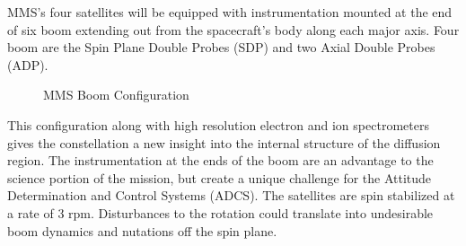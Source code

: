 MMS's four satellites will be equipped with instrumentation mounted at the end of six boom extending out from the spacecraft's body along each major axis.  Four boom are the Spin Plane Double Probes (SDP) and two Axial Double Probes (ADP).

\begin{figure}[H]
\centerline{}
\caption{MMS Boom Configuration \cite{tsat1c}}
\label{fig:booms}
\end{figure}

This configuration along with high resolution electron and ion spectrometers gives the constellation a new insight into the internal structure of the diffusion region.  The instrumentation at the ends of the boom are an advantage to the science portion of the mission, but create a unique challenge for the Attitude Determination and Control Systems (ADCS).  The satellites are spin stabilized at a rate of 3 rpm.  Disturbances to the rotation could translate into undesirable boom dynamics and nutations off the spin plane.







